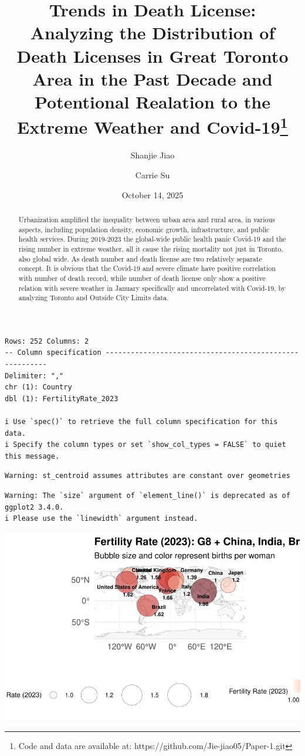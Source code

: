\documentclass[
  letterpaper,
  DIV=11,
  numbers=noendperiod]{scrartcl}
\title{Trends in Death License: Analyzing the Distribution of Death
Licenses in Great Toronto Area in the Past Decade and Potentional
Realation to the Extreme Weather and Covid-19\thanks{Code and data are
available at: https://github.com/Jie-jiao05/Paper-1.git}}
\author{Shanjie Jiao \and Carrie Su}
\date{October 14, 2025}
\begin{document}
\maketitle
\begin{abstract}
Urbanization amplified the inequality between urban area and rural area,
in various aspects, including population density, economic growth,
infrastructure, and public health services. During 2019-2023 the
global-wide public health panic Covid-19 and the rising number in
extreme weather, all it cause the rising mortality not just in Toronto,
also global wide. As death number and death license are two relatively
separate concept. It is obvious that the Covid-19 and severe climate
have positive correlation with number of death record, while number of
death license only show a positive relation with severe weather in
January specifically and uncorrelated with Covid-19, by analyzing
Toronto and Outside City Limits data.
\end{abstract}


\begin{verbatim}
Rows: 252 Columns: 2
-- Column specification --------------------------------------------------------
Delimiter: ","
chr (1): Country
dbl (1): FertilityRate_2023

i Use `spec()` to retrieve the full column specification for this data.
i Specify the column types or set `show_col_types = FALSE` to quiet this message.
\end{verbatim}

\begin{verbatim}
Warning: st_centroid assumes attributes are constant over geometries
\end{verbatim}

\begin{verbatim}
Warning: The `size` argument of `element_line()` is deprecated as of ggplot2 3.4.0.
i Please use the `linewidth` argument instead.
\end{verbatim}

\includegraphics{paper_files/figure-pdf/unnamed-chunk-2-1.pdf}
\end{document}
